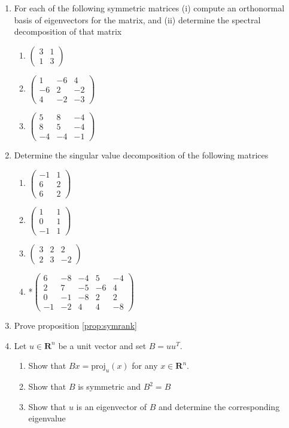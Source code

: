 \documentclass[12pt]{article}
\numberwithin{equation}{subsection}
\numberwithin{figure}{subsection}
\theoremstyle{note}
\newcommand{\R}{\mathbf{R}}
\newcommand\m[1]{\begin{pmatrix}#1\end{pmatrix}}
\newcommand\proj[2]{\mathrm{proj}_{#1}(#2)}
\begin{document}
\begin{enumerate}[label=\arabic*.]
\item For each of the following symmetric matrices (i) compute an orthonormal basis of eigenvectors for the matrix, and (ii) determine the spectral decomposition of that matrix
\begin{enumerate}
	\item $\m{ 3 & 1 \\ 1 & 3}$
	\item $\m{1 & -6 & 4 \\ -6 & 2 & -2 \\ 4 & -2 & -3}$
	\item $\m{5 & 8 & -4 \\ 8 & 5 & -4 \\ -4&-4&-1}$
\end{enumerate}

\item Determine the singular value decomposition of the following matrices

\begin{enumerate}
	\item $\m{-1 & 1 \\ 6 & 2\\ 6 & 2}$
	\item $\m{1 & 1 \\ 0 & 1 \\ -1 & 1}$
	\item $\m{3 & 2 & 2 \\ 2 & 3 & -2}$
	\item *$\m{6 & -8 & -4 & 5 & -4 \\ 2 & 7 & -5 & -6 & 4 \\ 0 & -1 & -8 & 2 & 2 \\ -1 & -2 & 4 & 4 & -8}$
\end{enumerate}

\item Prove proposition \ref{prop:symrank}

\item Let $u\in \R^n$ be a unit vector and set $B=uu^T$. 
\begin{enumerate}
	\item Show that $Bx=\proj{u}{x}$ for any $x\in \R^n$.
	\item Show that $B$ is symmetric and $B^2=B$
	\item Show that $u$ is an eigenvector of $B$ and determine the corresponding eigenvalue

\end{enumerate}


\end{enumerate}
\end{document}
